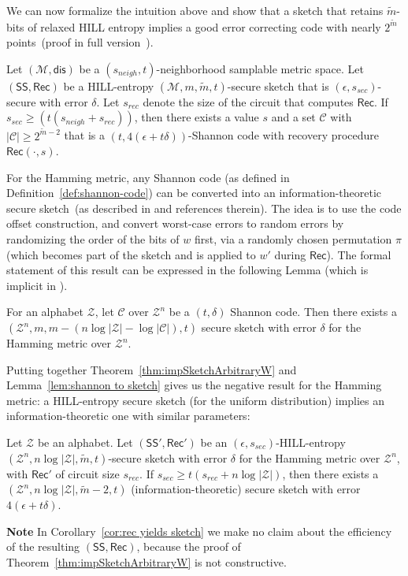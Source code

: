 \documentclass{llncs}
\newcommand{\thref}[1]{\mbox{Theorem~\ref{#1}}}
\newcommand{\corref}[1]{\mbox{Corollary~\ref{#1}}}
\newcommand{\lemref}[1]{\mbox{Lemma~\ref{#1}}}
\newcommand{\class}[1]{{\ensuremath{\mathsf{#1}}}}
\newcommand{\sketch}{\ensuremath{\class{SS}}\xspace}
\newcommand{\rec}{\ensuremath{\class{Rec}}\xspace}
\newcommand{\dis}{\ensuremath{\mathsf{dis}}}
\begin{document}
We can now formalize the intuition above and show that a sketch that retains $\tilde{m}$-bits of relaxed HILL entropy implies a good error correcting code with nearly $2^{\tilde{m}}$ points~(proof in full version~\cite{fullerMengReyzin2013}).
\begin{theorem}\label{thm:impSketchArbitraryW}
Let $(\mathcal{M}, \dis)$ be a $(s_{neigh}, t)$-neighborhood samplable metric space.  Let $(\sketch, \rec)$ be a HILL-entropy $(\mathcal{M}, m, \tilde{m}, t)$-secure sketch that is $(\epsilon, s_{sec})$-secure with error $\delta$.  Let $s_{rec}$ denote the size of the circuit that computes $\rec$.  If $s_{sec}\geq (t(s_{neigh}+s_{rec}))$,  then there exists a value $s$ and a set $\mathcal{C}$ with $|\mathcal{C}|\geq 2^{\tilde{m}-2}$  that is a $(t, 4(\epsilon+t\delta))$-Shannon code with recovery procedure $\rec(\cdot, s)$.
\end{theorem}

For the Hamming metric, any Shannon code (as defined in Definition~\ref{def:shannon-code}) can be converted into an information-theoretic secure sketch~(as described in \cite[Section 8.2]{DBLP:journals/siamcomp/DodisORS08} and references therein).  The idea is to use the code offset construction, and convert worst-case errors to random errors by randomizing the order of the bits of $w$ first, via a randomly chosen  permutation $\pi$  (which  becomes part of the sketch and is applied to $w'$ during $\rec$). The formal statement of this result  can be expressed in the following Lemma (which is implicit in \cite[Section 8.2]{DBLP:journals/siamcomp/DodisORS08}).
\begin{lemma}
\label{lem:shannon to sketch}
For an alphabet $\mathcal{Z}$, let $\mathcal{C}$ over $\mathcal{Z}^n$ be a $(t, \delta)$ Shannon code.  Then there exists a $(\mathcal{Z}^n, m, m-(n\log|\mathcal{Z}|-\log |\mathcal{C}|), t)$ secure sketch with error $\delta$ for the Hamming metric over $\mathcal{Z}^n$. 
\end{lemma}
Putting together \thref{thm:impSketchArbitraryW} and \lemref{lem:shannon to sketch} gives us the negative result for the Hamming metric: a HILL-entropy secure sketch (for the uniform distribution) implies an information-theoretic one with similar parameters:
\begin{corollary}
\label{cor:rec yields sketch}
Let $\mathcal{Z}$ be an alphabet. Let $(\sketch', \rec')$ be an $(\epsilon,s_{sec})$-HILL-entropy $(\mathcal{Z}^n, n\log |\mathcal{Z}|, \tilde{m}, t)$-secure sketch with error $\delta$ for the Hamming metric over $\mathcal{Z}^n$, with $\rec'$ of circuit size $s_{rec}$.
If $s_{sec}\geq t(s_{rec} + n\log |\mathcal{Z}|)$, then there exists a   $(\mathcal{Z}^n, n\log |\mathcal{Z}|, \tilde{m}-2,t)$ (information-theoretic) secure sketch with error
$4(\epsilon+t\delta)$. 
\end{corollary}
\textbf{Note} In \corref{cor:rec yields sketch} we make no claim about the efficiency of the resulting  $(\sketch, \rec)$, because the proof of \thref{thm:impSketchArbitraryW} is not constructive.  
\end{document}
